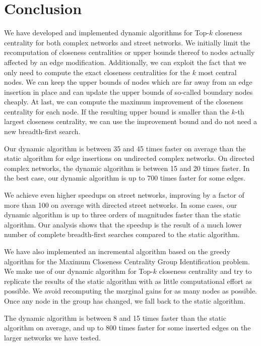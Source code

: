 
\chapter{Conclusion}
\label{ch:conclusion}

We have developed and implemented dynamic algorithms for Top-$k$ closeness centrality for both complex networks and street networks. We initially limit the recomputation of closeness centralities or upper bounds thereof to nodes actually affected by an edge modification. Additionally, we can exploit the fact that we only need to compute the exact closeness centralities for the $k$ most central nodes. We can keep the upper bounds of nodes which are far away from an edge insertion in place and can update the upper bounds of so-called boundary nodes cheaply. At last, we can compute the maximum improvement of the closeness centrality for each node. If the resulting upper bound is smaller than the $k$-th largest closeness centrality, we can use the improvement bound and do not need a new breadth-first search.

Our dynamic algorithm is between 35 and 45 times faster on average than the static algorithm for edge insertions on undirected complex networks. On directed complex networks, the dynamic algorithm is between 15 and 20 times faster. In the best case, our dynamic algorithm is up to 700 times faster for some edges.

We achieve even higher speedups on street networks, improving by a factor of more than 100 on average with directed street networks. In some cases, our dynamic algorithm is up to three orders of magnitudes faster than the static algorithm. Our analysis shows that the speedup is the result of a much lower number of complete breadth-first searches compared to the static algorithm.

We have also implemented an incremental algorithm based on the greedy algorithm for the Maximum Closeness Centrality Group Identification problem. We make use of our dynamic algorithm for Top-$k$ closeness centrality and try to replicate the results of the static algorithm with as little computational effort as possible. We avoid recomputing the marginal gains for as many nodes as possible. Once any node in the group has changed, we fall back to the static algorithm.

The dynamic algorithm is between 8 and 15 times faster than the static algorithm on average, and up to 800 times faster for some inserted edges on the larger networks we have tested.

